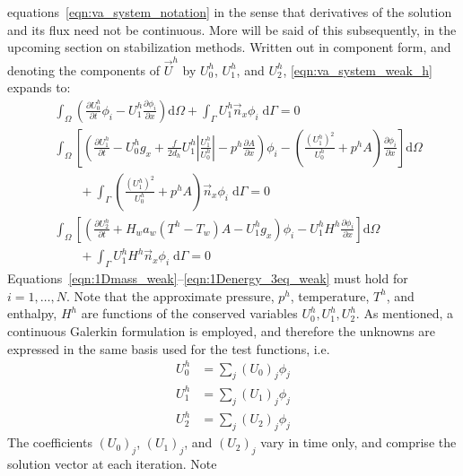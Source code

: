 equations~\eqref{eqn:va_system_notation} in the sense that derivatives of the  
solution and its flux need not be continuous. More will be said of this subsequently,
in the upcoming section on stabilization methods.  Written out in component form,
and denoting the components of $\vec{U}^h$ by $U_0^h$, $U_1^h$, and
$U_2^h$, \eqref{eqn:va_system_weak_h} expands to:
\begin{align}
  \label{eqn:1Dmass_weak}
  &
  \int_{\Omega} \left( \frac{\partial U_0^h}{\partial t} \phi_i -
    U_1^h \frac{\partial \phi_i}{\partial x} \right) \text{d}{\Omega}
  + \int_{\Gamma} U_1^h \vec{n}_x \phi_i \; \text{d}{\Gamma} = 0
  \\[12pt]
  \nonumber
  &
  \int_{\Omega} \left[ \left(\frac{\partial U_1^h}{\partial t}
      - U_0^h g_x + \frac{f}{2 d_h}  U_1^h \left|\frac{U_1^h}{U_0^h}\right| - p^h \frac{\partial A}{\partial x} \right) \phi_i
    - \left( \frac{(U_1^h)^2}{U_0^h} + p^hA \right) \frac{\partial\phi_i }{\partial x} \right] \text{d}{\Omega}
  \\
  \label{eqn:1Dmomentum_weak}
  &\qquad + \int_{\Gamma} \left( \frac{(U_1^h)^2}{U_0^h} + p^hA \right) \vec{n}_x \phi_i \; \text{d}{\Gamma} = 0
  \\[12pt]
  \nonumber
  &
  \int_{\Omega}
  \left[
  \left(
    \frac{\partial U_2^h}{\partial t} + H_w a_w (T^h-T_w) A - U_1^h g_x
  \right)
  \phi_i
    -  U_1^h H^h \frac{\partial \phi_i}{\partial x}
  \right]
  \text{d}{\Omega}
  \\
  \label{eqn:1Denergy_3eq_weak}
  &\qquad
  +
  \int_{\Gamma} U_1^h H^h \vec{n}_x \phi_i \; \text{d}{\Gamma} = 0
\end{align}
Equations~\eqref{eqn:1Dmass_weak}--\eqref{eqn:1Denergy_3eq_weak} must
hold for $i=1,\ldots,N$.  Note that the approximate pressure, $p^h$,
temperature, $T^h$, and enthalpy, $H^h$ are functions of the conserved
variables $U_0^h, U_1^h, U_2^h$.  As mentioned, a continuous
Galerkin formulation is employed, and therefore the unknowns are expressed in
the same basis used for the test functions, i.e.
\begin{align}
  U_0^h &= \sum_j (U_0)_j \phi_j
  \\
  U_1^h &= \sum_j (U_1)_j \phi_j
  \\
  U_2^h &= \sum_j (U_2)_j \phi_j
\end{align}
The coefficients $(U_0)_j$, $(U_1)_j$, and $(U_2)_j$ vary in time only, and comprise the
solution vector at each iteration.  Note
